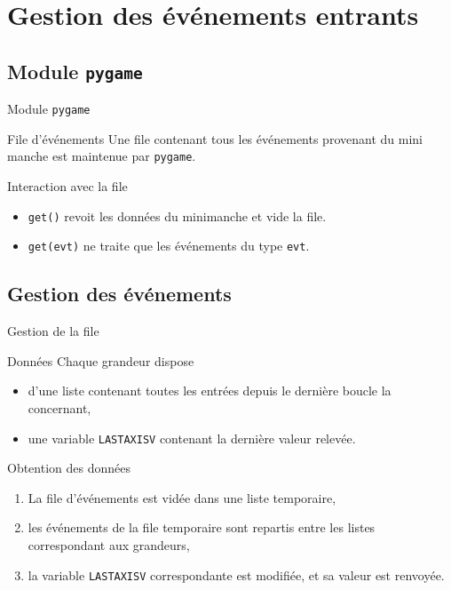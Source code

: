 \documentclass[footheight=2em]{beamer}
\begin{document}
\section{Gestion des événements entrants}
\subsection{Module \texttt{pygame}}
\begin{frame}[t]{Module \texttt{pygame}}
  \begin{block}{File d'événements}
    Une file contenant tous les événements provenant du mini manche est
    maintenue par \texttt{pygame}.
  \end{block}
  \begin{block}{Interaction avec la file}
    \begin{itemize}
      \item \texttt{get()} revoit les données du minimanche et vide la file.
      \item \texttt{get(evt)} ne traite que les événements du type \texttt{evt}.
    \end{itemize}
  \end{block}
\end{frame}

\subsection{Gestion des événements}
\begin{frame}[t]{Gestion de la file}
  \begin{block}{Données}
    Chaque grandeur dispose
    \begin{itemize}
      \item d'une liste contenant toutes les entrées depuis le dernière boucle
        la concernant,
      \item une variable \texttt{LASTAXISV} contenant la dernière
        valeur relevée.
    \end{itemize}
  \end{block}
  \begin{block}{Obtention des données}
    \begin{enumerate}
      \item La file d'événements est vidée dans une liste temporaire,
      \item les événements de la file temporaire sont repartis entre les listes
        correspondant aux grandeurs,
      \item la variable \texttt{LASTAXISV} correspondante est modifiée, et sa
        valeur est renvoyée.
    \end{enumerate}
  \end{block}
\end{frame}
\end{document}
